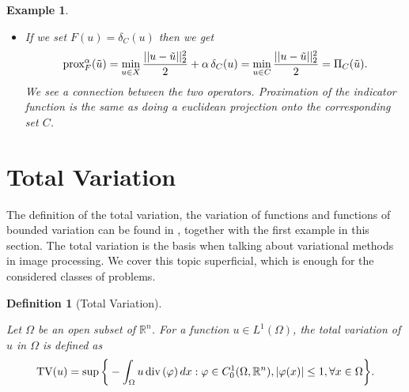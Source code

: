 \documentclass{scrreprt}
\newtheorem{definition}[theorem]{Definition}
\newtheorem{example}[theorem]{Example}
\begin{document}
\begin{example}
\begin{itemize}
\begin{enumerate}
\begin{equation}
\begin{array}{l l}
                                       1, & \textnormal{otherwise.}
                                    \end{array}
                                \right.
                                \notag
                            \end{equation}
                    \end{enumerate}
                \item If we set $F(u) = \delta_{C}(u)$ then we get
                $$
                    \textnormal{prox}^{\alpha}_{F}(\tilde{u}) = \min\limits_{u \in X} \frac{||u - \tilde{u}||_{2}^{2}}{2} + \alpha \, \delta_{C}(u) = \min\limits_{u \in C} \frac{||u - \tilde{u}||_{2}^{2}}{2} = \Pi_{C}(\tilde{u}).
                $$
                We see a connection between the two operators. Proximation of the indicator function is the same as doing a euclidean projection onto the corresponding set $C$.
            \end{itemize}
        \end{example}


    \section{Total Variation} %
    \label{sec:total_variation}
        
        The definition of the total variation, the variation of functions and functions of bounded variation can be found in \cite{Giusti}, together with the first example in this section. The total variation is the basis when talking about variational methods in image processing. We cover this topic superficial, which is enough for the considered classes of problems.

        \begin{definition}[Total Variation] %
        \label{def:total_variation}

            Let $\Omega$ be an open subset of $\mathbb{R}^{n}$. For a function $u \in L^{1}(\Omega)$, the \textnormal{total variation} of $u$ in $\Omega$ is defined as
                $$
                    \textnormal{TV}(u) = \sup \bigg\{ -\int_{\Omega} u\, \textnormal{div}\, (\varphi)\, dx : \varphi \in C^{1}_{0}(\Omega, \mathbb{R}^{n}), |\varphi(x)| \le 1, \forall x \in \Omega \bigg\}.
                $$
        \end{definition}
\end{document}
